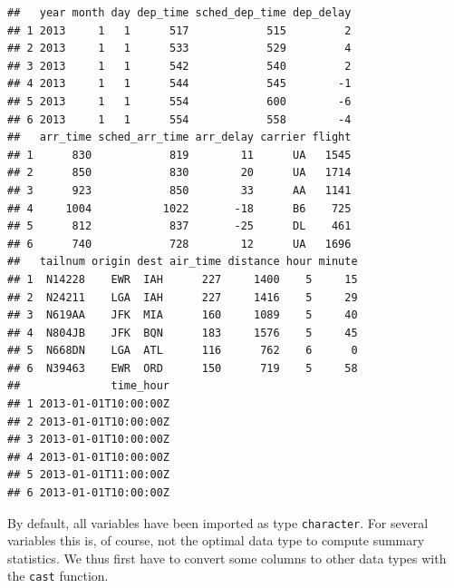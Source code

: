 \documentclass[
  12pt,
]{style/krantz}
\newenvironment{Shaded}{\begin{snugshade}}{\end{snugshade}}
\newcommand{\FunctionTok}[1]{\textcolor[rgb]{0.00,0.00,0.00}{#1}}
\newcommand{\NormalTok}[1]{#1}
\newcommand{\OtherTok}[1]{\textcolor[rgb]{0.56,0.35,0.01}{#1}}
\newcommand{\SpecialCharTok}[1]{\textcolor[rgb]{0.00,0.00,0.00}{#1}}
\newcommand{\StringTok}[1]{\textcolor[rgb]{0.31,0.60,0.02}{#1}}
\begin{document}
\begin{verbatim}
##   year month day dep_time sched_dep_time dep_delay
## 1 2013     1   1      517            515         2
## 2 2013     1   1      533            529         4
## 3 2013     1   1      542            540         2
## 4 2013     1   1      544            545        -1
## 5 2013     1   1      554            600        -6
## 6 2013     1   1      554            558        -4
##   arr_time sched_arr_time arr_delay carrier flight
## 1      830            819        11      UA   1545
## 2      850            830        20      UA   1714
## 3      923            850        33      AA   1141
## 4     1004           1022       -18      B6    725
## 5      812            837       -25      DL    461
## 6      740            728        12      UA   1696
##   tailnum origin dest air_time distance hour minute
## 1  N14228    EWR  IAH      227     1400    5     15
## 2  N24211    LGA  IAH      227     1416    5     29
## 3  N619AA    JFK  MIA      160     1089    5     40
## 4  N804JB    JFK  BQN      183     1576    5     45
## 5  N668DN    LGA  ATL      116      762    6      0
## 6  N39463    EWR  ORD      150      719    5     58
##              time_hour
## 1 2013-01-01T10:00:00Z
## 2 2013-01-01T10:00:00Z
## 3 2013-01-01T10:00:00Z
## 4 2013-01-01T10:00:00Z
## 5 2013-01-01T11:00:00Z
## 6 2013-01-01T10:00:00Z
\end{verbatim}

By default, all variables have been imported as type \texttt{character}. For several variables this is, of course, not the optimal data type to compute summary statistics. We thus first have to convert some columns to other data types with the \texttt{cast} function.

\begin{Shaded}
\end{Shaded}
\end{document}
